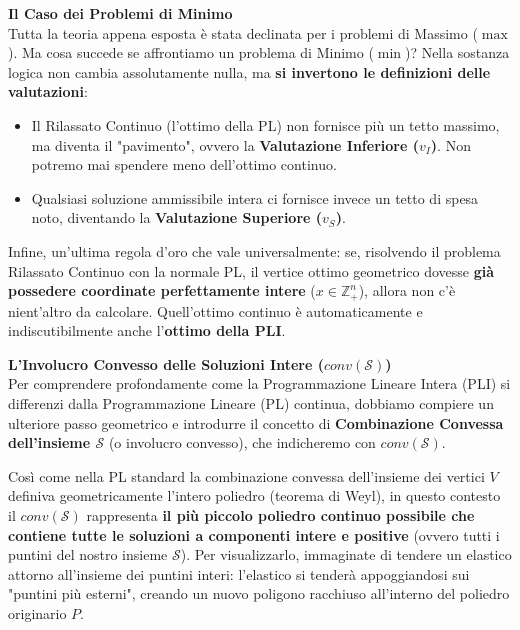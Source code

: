 \documentclass[12pt, a4paper]{article}
\begin{document}
	\vspace{0.4cm}
	\textbf{Il Caso dei Problemi di Minimo}\\
	Tutta la teoria appena esposta è stata declinata per i problemi di Massimo ($\max$). Ma cosa succede se affrontiamo un problema di Minimo ($\min$)? 
	Nella sostanza logica non cambia assolutamente nulla, ma \textbf{si invertono le definizioni delle valutazioni}:
	\begin{itemize}[label=\textcolor{titlecolor}{\Large\textbullet}, itemsep=2pt, leftmargin=1.5cm]
		\item Il Rilassato Continuo (l'ottimo della PL) non fornisce più un tetto massimo, ma diventa il "pavimento", ovvero la \textbf{Valutazione Inferiore ($v_I$)}. Non potremo mai spendere meno dell'ottimo continuo.
		\item Qualsiasi soluzione ammissibile intera ci fornisce invece un tetto di spesa noto, diventando la \textbf{Valutazione Superiore ($v_S$)}.
	\end{itemize}
	Infine, un'ultima regola d'oro che vale universalmente: se, risolvendo il problema Rilassato Continuo con la normale PL, il vertice ottimo geometrico dovesse \textbf{già possedere coordinate perfettamente intere} ($x \in \mathbb{Z}^n_+$), allora non c'è nient'altro da calcolare. Quell'ottimo continuo è automaticamente e indiscutibilmente anche l'\textbf{ottimo della PLI}.
	
	\vspace{0.4cm}
	\textbf{L'Involucro Convesso delle Soluzioni Intere ($conv(\mathcal{S})$)}\\
	Per comprendere profondamente come la Programmazione Lineare Intera (PLI) si differenzi dalla Programmazione Lineare (PL) continua, dobbiamo compiere un ulteriore passo geometrico e introdurre il concetto di \textbf{Combinazione Convessa dell'insieme $\mathcal{S}$} (o involucro convesso), che indicheremo con $conv(\mathcal{S})$.
	
	Così come nella PL standard la combinazione convessa dell'insieme dei vertici $V$ definiva geometricamente l'intero poliedro (teorema di Weyl), in questo contesto il $conv(\mathcal{S})$ rappresenta \textbf{il più piccolo poliedro continuo possibile che contiene tutte le soluzioni a componenti intere e positive} (ovvero tutti i puntini del nostro insieme $\mathcal{S}$). 
	Per visualizzarlo, immaginate di tendere un elastico attorno all'insieme dei puntini interi: l'elastico si tenderà appoggiandosi sui "puntini più esterni", creando un nuovo poligono racchiuso all'interno del poliedro originario $P$.
	
\end{document}
